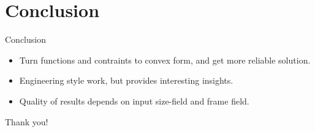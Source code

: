 \documentclass{beamer}
\begin{document}
\section{Conclusion}
\begin{frame}{Conclusion}
\begin{itemize}
\item Turn functions and contraints to convex form, and get more reliable solution.
\item Engineering style work, but provides interesting insights.
\item Quality of results depends on input size-field and frame field.
\end{itemize}
\end{frame}

\begin{frame}{}
\hspace{1.5in}\huge{Thank you!}
\end{frame}
\end{document}
